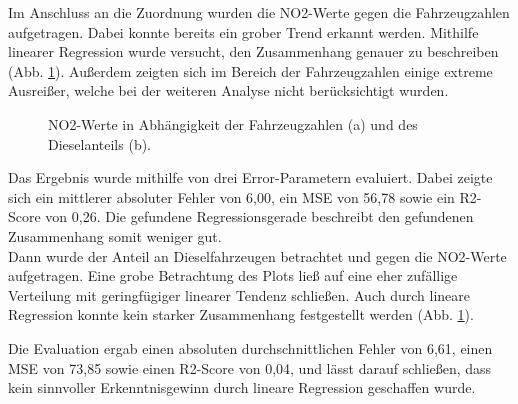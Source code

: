 \documentclass[11pt,a4paper,oneside,german]{article}
\begin{document}
	Im Anschluss an die Zuordnung wurden die NO2-Werte gegen die Fahrzeugzahlen aufgetragen. Dabei konnte bereits ein grober Trend erkannt werden. Mithilfe linearer Regression wurde versucht, den Zusammenhang genauer zu beschreiben (Abb. \ref{fig:linreginsgesamt}). Außerdem zeigten sich im Bereich der Fahrzeugzahlen einige extreme Ausreißer, welche bei der weiteren Analyse nicht berücksichtigt wurden.
	
	\begin{figure}[h!]
		\centering
		\caption{NO2-Werte in Abhängigkeit der Fahrzeugzahlen (a) und des Dieselanteils (b).}
		\label{fig:linreginsgesamt}
	\end{figure}
	
	Das Ergebnis wurde mithilfe von drei Error-Parametern evaluiert. Dabei zeigte sich ein mittlerer absoluter Fehler von 6,00, ein MSE von 56,78 sowie ein R2-Score von 0,26. Die gefundene Regressionsgerade beschreibt den gefundenen Zusammenhang somit weniger gut. \\
	Dann wurde der Anteil an Dieselfahrzeugen betrachtet und gegen die NO2-Werte aufgetragen. Eine grobe Betrachtung des Plots ließ auf eine eher zufällige Verteilung mit geringfügiger linearer Tendenz schließen. Auch durch lineare Regression konnte kein starker Zusammenhang festgestellt werden (Abb. \ref{fig:linreginsgesamt}).

	
	Die Evaluation ergab einen absoluten durchschnittlichen Fehler von 6,61, einen MSE von 73,85 sowie einen R2-Score von 0,04, und lässt darauf schließen, dass kein sinnvoller Erkenntnisgewinn durch lineare Regression geschaffen wurde.
	
\end{document}

